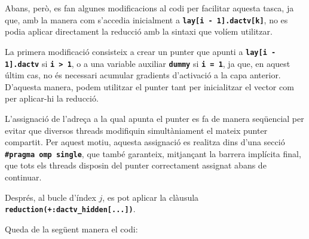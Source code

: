\documentclass{article}
\begin{document}
\noindent Abans, però, es fan algunes modificacions al codi per facilitar aquesta tasca, ja que, amb la manera com s'accedia inicialment a \textbf{\texttt{lay[i - 1].dactv[k]}}, no es podia aplicar directament la reducció amb la sintaxi que volíem utilitzar. 

\noindent La primera modificació consisteix a crear un punter que apunti a \textbf{\texttt{lay[i - 1].dactv}} si \textbf{\texttt{i > 1}}, o a una variable auxiliar \textbf{\texttt{dummy}} si \textbf{\texttt{i = 1}}, ja que, en aquest últim cas, no és necessari acumular gradients d'activació a la capa anterior. D'aquesta manera, podem utilitzar el punter tant per inicialitzar el vector com per aplicar-hi la reducció.


\noindent L'assignació de l'adreça a la qual apunta el punter es fa de manera seqüencial per evitar que diversos threads modifiquin simultàniament el mateix punter compartit. Per aquest motiu, aquesta assignació es realitza dins d'una secció \textbf{\texttt{\#pragma omp single}}, que també garanteix, mitjançant la barrera implícita final, que tots els threads disposin del punter correctament assignat abans de continuar.


Després, al bucle d'índex $j$, es pot aplicar la clàusula \textbf{\texttt{reduction(+:dactv\_hidden[...])}}.

Queda de la següent manera el codi:
\end{document}
